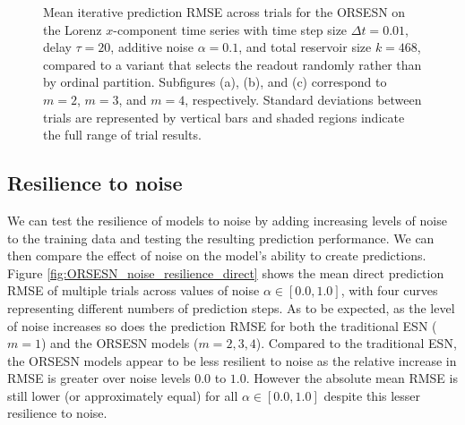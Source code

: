\begin{figure}
    \caption{Mean iterative prediction RMSE across trials for the ORSESN on the Lorenz $x$-component time series with time step size $\Delta t=0.01$, delay $\tau=20$, additive noise $\alpha=0.1$, and total reservoir size $k=468$, compared to a variant that selects the readout randomly rather than by ordinal partition. Subfigures (a), (b), and (c) correspond to $m=2$, $m=3$, and $m=4$, respectively. Standard deviations between trials are represented by vertical bars and shaded regions indicate the full range of trial results.}
    \label{fig:ORSESN_routing_ordinal_vs_random}
\end{figure}



\subsection{Resilience to noise}

We can test the resilience of models to noise by adding increasing levels of noise to the training data and testing the resulting prediction performance. We can then compare the effect of noise on the model's ability to create predictions. Figure \ref{fig:ORSESN_noise_resilience_direct} shows the mean direct prediction RMSE of multiple trials across values of noise $\alpha\in[0.0, 1.0]$, with four curves representing different numbers of prediction steps. As to be expected, as the level of noise increases so does the prediction RMSE for both the traditional ESN ($m=1$) and the ORSESN models ($m=2,3,4$). Compared to the traditional ESN, the ORSESN models appear to be less resilient to noise as the relative increase in RMSE is greater over noise levels $0.0$ to $1.0$. However the absolute mean RMSE is still lower (or approximately equal) for all $\alpha \in [0.0, 1.0]$ despite this lesser resilience to noise.

